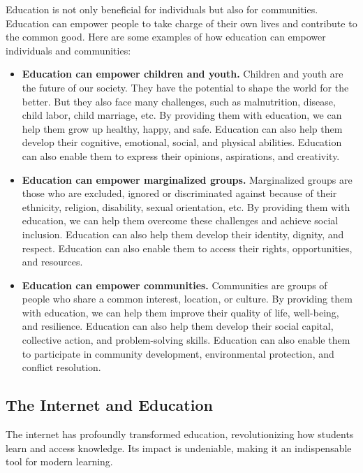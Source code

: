 \documentclass[a4paper,11pt]{article}
\begin{document}
Education is not only beneficial for individuals but also for communities. Education can empower people to take charge of their own lives and contribute to the common good. Here are some examples of how education can empower individuals and communities:

\begin{itemize}
	\item \textbf{Education can empower children and youth.}
	 Children and youth are the future of our society. They have the potential to shape the world for the better. But they also face many challenges, such as malnutrition, disease, child labor, child marriage, etc. By providing them with education, we can help them grow up healthy, happy, and safe. Education can also help them develop their cognitive, emotional, social, and physical abilities. Education can also enable them to express their opinions, aspirations, and creativity.
	\item \textbf{Education can empower marginalized groups.}
	 Marginalized groups are those who are excluded, ignored or discriminated against because of their ethnicity, religion, disability, sexual orientation, etc. By providing them with education, we can help them overcome these challenges and achieve social inclusion. Education can also help them develop their identity, dignity, and respect. Education can also enable them to access their rights, opportunities, and resources.
	\item \textbf{Education can empower communities.}
	 Communities are groups of people who share a common interest, location, or culture. By providing them with education, we can help them improve their quality of life, well-being, and resilience. Education can also help them develop their social capital, collective action, and problem-solving skills. Education can also enable them to participate in community development, environmental protection, and conflict resolution.
\end{itemize}



\subsection{The Internet and Education} 

The internet has profoundly transformed education, revolutionizing how students learn and access knowledge. Its impact is undeniable, making it an indispensable tool for modern learning.\cite{how-internet-beneficial-students}
\end{document}
